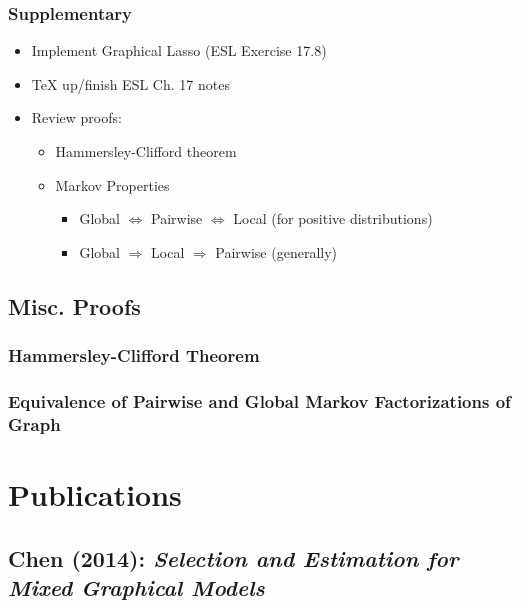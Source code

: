 \documentclass[11pt]{article}
\begin{document}
\subsection*{Supplementary}

\begin{itemize}
    \item Implement Graphical Lasso (ESL Exercise 17.8)
    \item TeX up/finish ESL Ch. 17 notes 
    \item Review proofs:
    \begin{itemize}
    	\item Hammersley-Clifford theorem
	    \item Markov Properties  
        \begin{itemize}
            \item Global $\Leftrightarrow$ Pairwise $\Leftrightarrow$ Local (for positive distributions)
            \item Global $\Rightarrow$ Local $\Rightarrow$ Pairwise (generally)
        \end{itemize}
    \end{itemize}
\end{itemize}

\newpage 
\section*{Misc. Proofs}

\subsection*{Hammersley-Clifford Theorem}

\subsection*{Equivalence of Pairwise and Global Markov Factorizations of Graph}


\newpage 

\begin{tcolorbox}
\vspace{4mm}
\bf \LARGE \chapter{Publications}
\vspace{4mm}
\end{tcolorbox}

\section*{Chen (2014): {\large \it Selection and Estimation for Mixed Graphical Models}}
\end{document}
